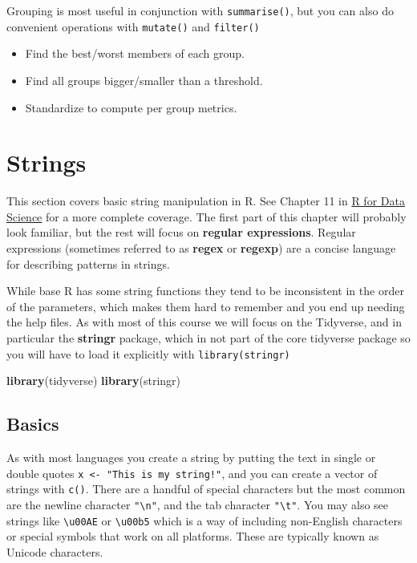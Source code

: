 \documentclass[]{book}
\newenvironment{Shaded}{\begin{snugshade}}{\end{snugshade}}
\newcommand{\KeywordTok}[1]{\textcolor[rgb]{0.13,0.29,0.53}{\textbf{#1}}}
\newcommand{\NormalTok}[1]{#1}
\providecommand{\tightlist}{%
  \setlength{\itemsep}{0pt}\setlength{\parskip}{0pt}}
\theoremstyle{definition}
\theoremstyle{definition}
\theoremstyle{definition}
\theoremstyle{remark}
\begin{document}
Grouping is most useful in conjunction with \texttt{summarise()}, but
you can also do convenient operations with \texttt{mutate()} and
\texttt{filter()}

\begin{itemize}
\tightlist
\item
  Find the best/worst members of each group.
\item
  Find all groups bigger/smaller than a threshold.
\item
  Standardize to compute per group metrics.
\end{itemize}

\hypertarget{strings}{%
\chapter{Strings}\label{strings}}

This section covers basic string manipulation in R. See Chapter 11 in
\href{http://r4ds.had.co.nz/strings.html}{R for Data Science} for a more
complete coverage. The first part of this chapter will probably look
familiar, but the rest will focus on \textbf{regular expressions}.
Regular expressions (sometimes referred to as \textbf{regex} or
\textbf{regexp}) are a concise language for describing patterns in
strings.

While base R has some string functions they tend to be inconsistent in
the order of the parameters, which makes them hard to remember and you
end up needing the help files. As with most of this course we will focus
on the Tidyverse, and in particular the \textbf{stringr} package, which
in not part of the core tidyverse package so you will have to load it
explicitly with \texttt{library(stringr)}

\begin{Shaded}
\begin{Highlighting}[]
\KeywordTok{library}\NormalTok{(tidyverse)}
\KeywordTok{library}\NormalTok{(stringr)}
\end{Highlighting}
\end{Shaded}

\hypertarget{basics}{%
\section{Basics}\label{basics}}

As with most languages you create a string by putting the text in single
or double quotes \texttt{x\ \textless{}-\ "This\ is\ my\ string!"}, and
you can create a vector of strings with \texttt{c()}. There are a
handful of special characters but the most common are the newline
character \texttt{"\textbackslash{}n"}, and the tab character
\texttt{"\textbackslash{}t"}. You may also see strings like
\texttt{\textbackslash{}u00AE} or \texttt{\textbackslash{}u00b5} which
is a way of including non-English characters or special symbols that
work on all platforms. These are typically known as Unicode characters.
\end{document}
